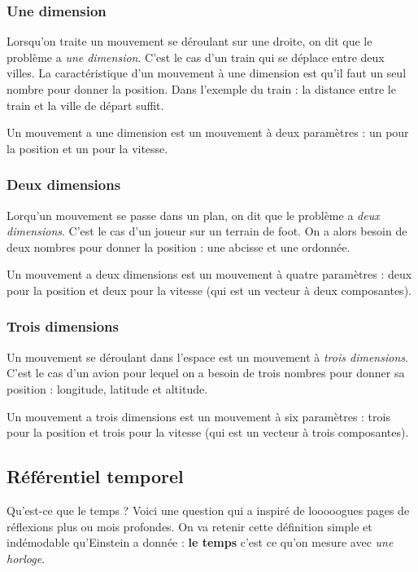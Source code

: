 \documentclass[a4paper,12pt]{book}
\theoremstyle{mes_exemples}	\newtheorem{exemple}[numtho]{Exemple}
\theoremstyle{mes_tho}
\newcommand{\defe}[2]{\textbf{#1}\index{#2}}
\begin{document}
\subsubsection{Une dimension} Lorsqu'on traite un mouvement se déroulant sur une droite, on dit que le problème a \emph{une dimension}. C'est le cas  d'un train qui se déplace entre deux villes. La caractéristique d'un mouvement à une dimension est qu'il faut un seul nombre pour donner la position. Dans l'exemple du train : la distance entre le train et la ville de départ suffit.

Un mouvement a une dimension est un mouvement à deux paramètres : un pour la position et un pour la vitesse.

\subsubsection{Deux dimensions} Lorqu'un mouvement se passe dans un plan, on dit que le problème a \emph{deux dimensions}. C'est le cas d'un joueur sur un terrain de foot. On a alors besoin de deux nombres pour donner la position : une abcisse et une ordonnée. 

Un mouvement a deux dimensions est un mouvement à quatre paramètres : deux pour la position et deux pour la vitesse (qui est un vecteur à deux composantes).

\subsubsection{Trois dimensions} Un mouvement se déroulant dans l'espace est un mouvement à \emph{trois dimensions}. C'est le cas d'un avion pour lequel on a besoin de trois nombres pour donner sa position : longitude, latitude et altitude.

Un mouvement a trois dimensions est un mouvement à six paramètres : trois pour la position et trois pour la vitesse (qui est un vecteur à trois composantes).

\subsection{Référentiel temporel}

Qu'est-ce que le temps ? Voici une question qui a inspiré de looooogues pages de réflexions plus ou mois profondes. On va retenir cette définition simple et indémodable qu'Einstein a donnée : \defe{le temps}{Temps} c'est ce qu'on mesure avec \emph{une horloge}. 
\end{document}
